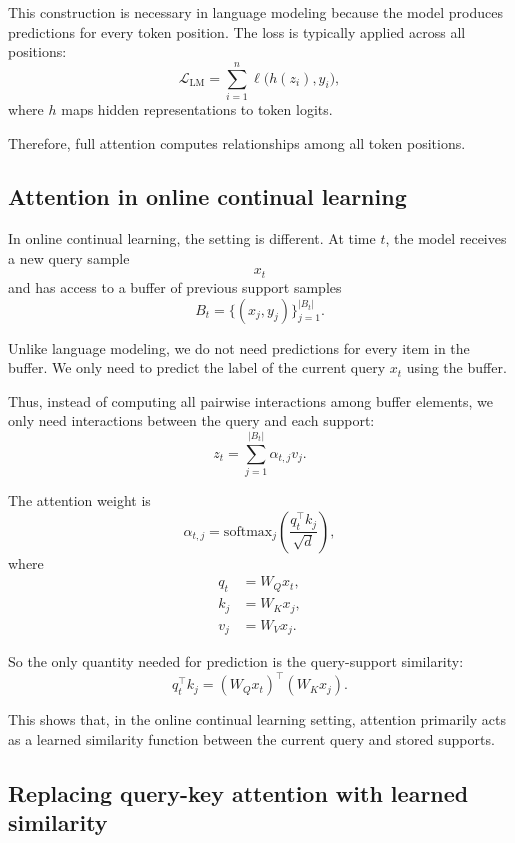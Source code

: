 \documentclass{article}
\begin{document}
This construction is necessary in language modeling because the model produces predictions for every token position. The loss is typically applied across all positions:
\begin{equation}
\mathcal{L}_{\mathrm{LM}}
=
\sum_{i=1}^{n}
\ell\big(h(z_i), y_i\big),
\end{equation}
where $h$ maps hidden representations to token logits.

Therefore, full attention computes relationships among all token positions.

\subsection{Attention in online continual learning}

In online continual learning, the setting is different. At time $t$, the model receives a new query sample
\[
x_t
\]
and has access to a buffer of previous support samples
\[
B_t = \{(x_j,y_j)\}_{j=1}^{|B_t|}.
\]

Unlike language modeling, we do not need predictions for every item in the buffer. We only need to predict the label of the current query $x_t$ using the buffer.

Thus, instead of computing all pairwise interactions among buffer elements, we only need interactions between the query and each support:
\begin{equation}
z_t = \sum_{j=1}^{|B_t|} \alpha_{t,j} v_j.
\end{equation}

The attention weight is
\begin{equation}
\alpha_{t,j}
=
\mathrm{softmax}_j
\left(
\frac{q_t^\top k_j}{\sqrt{d}}
\right),
\end{equation}
where
\begin{align}
q_t &= W_Q x_t,\\
k_j &= W_K x_j,\\
v_j &= W_V x_j.
\end{align}

So the only quantity needed for prediction is the query-support similarity:
\begin{equation}
q_t^\top k_j
=
(W_Q x_t)^\top (W_K x_j).
\end{equation}

This shows that, in the online continual learning setting, attention primarily acts as a learned similarity function between the current query and stored supports.

\subsection{Replacing query-key attention with learned similarity}
\end{document}
